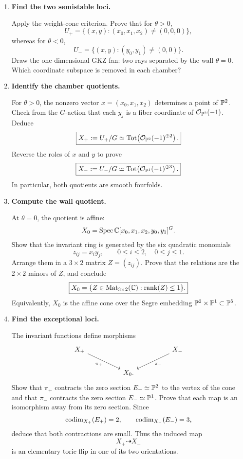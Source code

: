 \begin{enumerate}[label=\textbf{Hint \arabic*.},wide=0pt]

\item \textbf{Find the two semistable loci.}

Apply the weight-cone criterion.  Prove that for \(\theta>0\),
\[
U_+
=
\{(x,y):(x_0,x_1,x_2)\neq(0,0,0)\},
\]
whereas for \(\theta<0\),
\[
U_-
=
\{(x,y):(y_0,y_1)\neq(0,0)\}.
\]
Draw the one-dimensional GKZ fan: two rays separated by the wall
\(\theta=0\).  Which coordinate subspace is removed in each chamber?

\item \textbf{Identify the chamber quotients.}

For \(\theta>0\), the nonzero vector
\(x=(x_0,x_1,x_2)\) determines a point of \(\mathbb{P}^2\).  Check from the
\(G\)-action that each \(y_j\) is a fiber coordinate of
\(\mathcal O_{\mathbb{P}^2}(-1)\).  Deduce
\[
\boxed{
X_+:=U_+/G
\simeq
\operatorname{Tot}\!\left(
\mathcal O_{\mathbb{P}^2}(-1)^{\oplus2}\right).}
\]
Reverse the roles of \(x\) and \(y\) to prove
\[
\boxed{
X_-:=U_-/G
\simeq
\operatorname{Tot}\!\left(
\mathcal O_{\mathbb{P}^1}(-1)^{\oplus3}\right).}
\]
In particular, both quotients are smooth fourfolds.

\item \textbf{Compute the wall quotient.}

At \(\theta=0\), the quotient is affine:
\[
X_0=\operatorname{Spec}\mathbb{C}[x_0,x_1,x_2,y_0,y_1]^G.
\]
Show that the invariant ring is generated by the six quadratic
monomials
\[
z_{ij}=x_i y_j,
\qquad
0\leq i\leq2,
\quad
0\leq j\leq1.
\]
Arrange them in a \(3\times2\) matrix \(Z=(z_{ij})\).  Prove that the
relations are the \(2\times2\) minors of \(Z\), and conclude
\[
\boxed{
X_0
=
\{Z\in\operatorname{Mat}_{3\times2}(\mathbb{C}):
  \operatorname{rank}(Z)\leq1\}.}
\]
Equivalently, \(X_0\) is the affine cone over the Segre embedding
\(\mathbb{P}^2\times\mathbb{P}^1\subset\mathbb{P}^5\).

\item \textbf{Find the exceptional loci.}

The invariant functions define morphisms
\[
\begin{tikzcd}[column sep=huge]
X_+ \arrow[dr,"\pi_+"']
&&
X_- \arrow[dl,"\pi_-"]
\\
&X_0.&
\end{tikzcd}
\]
Show that \(\pi_+\) contracts the zero section
\(E_+\simeq\mathbb{P}^2\) to the vertex of the cone and that \(\pi_-\)
contracts the zero section \(E_-\simeq\mathbb{P}^1\).  Prove that each map is
an isomorphism away from its zero section.  Since
\[
\operatorname{codim}_{X_+}(E_+)=2,
\qquad
\operatorname{codim}_{X_-}(E_-)=3,
\]
deduce that both contractions are small.  Thus the induced map
\[
X_+\dashrightarrow X_-
\]
is an elementary toric flip in one of its two orientations.


\end{enumerate}

